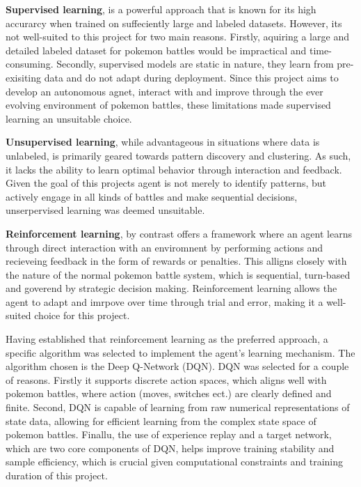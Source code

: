 \textbf{Supervised learning}, is a powerful approach that is known for its high accurarcy when trained on
suffeciently large and labeled datasets. However, its not well-suited to this project for
two main reasons. Firstly, aquiring a large and detailed labeled dataset for pokemon battles
would be impractical and time-consuming. Secondly, supervised models are static in nature, they learn
from pre-exisiting data and do not adapt during deployment. Since this project aims to develop
an autonomous agnet, interact with and improve through the ever evolving environment of pokemon battles, 
these limitations made supervised learning an unsuitable choice.

\textbf{Unsupervised learning}, while advantageous in situations where data is unlabeled, is primarily
geared towards pattern discovery and clustering. As such, it lacks the ability to learn 
optimal behavior through interaction and feedback. Given the goal of this projects agent is not
merely to identify patterns, but actively engage in all kinds of battles and make sequential decisions,
unserpervised learning was deemed unsuitable.

\textbf{Reinforcement learning}, by contrast offers a framework where an agent learns through direct interaction
with an enviromnent by performing actions and recieveing feedback in the form of rewards or penalties.
This alligns closely with the nature of the normal pokemon battle system, which is sequential, 
turn-based and goverend by strategic decision making. Reinforcement learning allows the agent to
adapt and imrpove over time through trial and error, making it a well-suited choice for this project.

Having established that reinforcement learning as the preferred approach, a specific algorithm
was selected to implement the agent's learning mechanism. The algorithm chosen is the 
Deep Q-Network (DQN). DQN was selected for a couple of reasons. Firstly it supports discrete 
action spaces, which aligns well with pokemon battles, where action (moves, switches ect.) are
clearly defined and finite. Second, DQN is capable of learning from raw numerical representations
of state data, allowing for efficient learning from the complex state space of pokemon battles.
Finallu, the use of experience replay and a target network, which are two core components of DQN, 
helps improve training stability and sample efficiency, which is crucial given computational constraints
and training duration of this project.